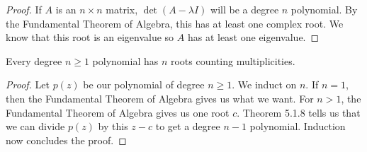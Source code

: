 \begin{proof}
    If $A$ is an $n\times n$ matrix, $\det(A-\lambda I)$ will be a degree $n$ polynomial. By the Fundamental Theorem of Algebra, this has at least one complex root. We know that this root is an eigenvalue so $A$ has at least one eigenvalue.
\end{proof}
\begin{corollary}
    Every degree $n\geq 1$ polynomial has $n$ roots counting multiplicities.
\end{corollary}
\begin{proof}
    Let $p(z)$ be our polynomial of degree $n\geq 1$. We induct on $n$. If $n=1$, then the Fundamental Theorem of Algebra gives us what we want. For $n>1$, the Fundamental Theorem of Algebra gives us one root $c$. Theorem 5.1.8 tells us that we can divide $p(z)$ by this $z-c$ to get a degree $n-1$ polynomial. Induction now concludes the proof.
\end{proof}
